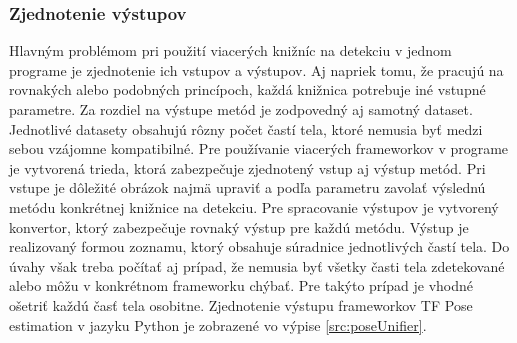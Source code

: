 \documentclass[slovak,master,dept460,male,cpp,cpdeclaration]{diploma}
\begin{document}
\subsubsection*{Zjednotenie výstupov}
	\label{sec:intersect}
Hlavným problémom pri použití viacerých knižníc na detekciu v jednom programe  je zjednotenie  ich vstupov a výstupov. Aj napriek tomu, že pracujú na rovnakých alebo podobných princípoch, každá knižnica potrebuje iné vstupné parametre. Za rozdiel na výstupe metód je zodpovedný aj samotný dataset. Jednotlivé datasety obsahujú rôzny počet častí tela, ktoré nemusia  byť medzi sebou vzájomne kompatibilné. Pre  používanie viacerých frameworkov v programe je vytvorená  trieda, ktorá  zabezpečuje zjednotený vstup aj výstup metód. Pri vstupe je dôležité obrázok najmä upraviť a podľa parametru zavolať výslednú metódu  konkrétnej knižnice na detekciu. Pre spracovanie  výstupov je  vytvorený konvertor, ktorý zabezpečuje  rovnaký výstup pre každú metódu. Výstup je realizovaný formou zoznamu, ktorý obsahuje súradnice  jednotlivých častí tela.  Do úvahy však treba počítať aj prípad, že nemusia byť všetky časti tela zdetekované alebo môžu v konkrétnom frameworku chýbať. Pre takýto prípad je vhodné ošetriť každú časť  tela osobitne. Zjednotenie výstupu frameworkov TF Pose estimation v jazyku Python je zobrazené vo výpise \ref{src:poseUnifier}.


\newpage

\end{document}
